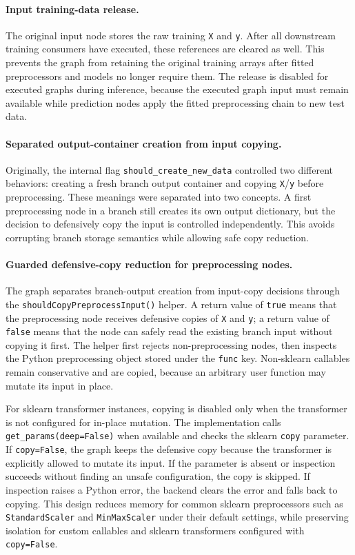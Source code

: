 \documentclass[11pt,a4paper]{article}
\begin{document}
\paragraph{Input training-data release.}
The original input node stores the raw training \texttt{X} and \texttt{y}.
After all downstream training consumers have executed, these references are
cleared as well. This prevents the graph from retaining the original training
arrays after fitted preprocessors and models no longer require them. The
release is disabled for executed graphs during inference, because the executed
graph input must remain available while prediction nodes apply the fitted
preprocessing chain to new test data.

\paragraph{Separated output-container creation from input copying.}
Originally, the internal flag \texttt{should\_create\_new\_data} controlled two
different behaviors: creating a fresh branch output container and copying
\texttt{X}/\texttt{y} before preprocessing. These meanings were separated into
two concepts. A first preprocessing node in a branch still creates its own
output dictionary, but the decision to defensively copy the input is controlled
independently. This avoids corrupting branch storage semantics while allowing
safe copy reduction.

\paragraph{Guarded defensive-copy reduction for preprocessing nodes.}
The graph separates branch-output creation from input-copy decisions through
the \texttt{shouldCopyPreprocessInput()} helper. A return value of
\texttt{true} means that the preprocessing node receives defensive copies of
\texttt{X} and \texttt{y}; a return value of \texttt{false} means that the node
can safely read the existing branch input without copying it first. The helper
first rejects non-preprocessing nodes, then inspects the Python preprocessing
object stored under the \texttt{func} key. Non-sklearn callables remain
conservative and are copied, because an arbitrary user function may mutate its
input in place.

For sklearn transformer instances, copying is disabled only when the
transformer is not configured for in-place mutation. The implementation calls
\texttt{get\_params(deep=False)} when available and checks the sklearn
\texttt{copy} parameter. If \texttt{copy=False}, the graph keeps the defensive
copy because the transformer is explicitly allowed to mutate its input. If the
parameter is absent or inspection succeeds without finding an unsafe
configuration, the copy is skipped. If inspection raises a Python error, the
backend clears the error and falls back to copying. This design reduces memory
for common sklearn preprocessors such as \texttt{StandardScaler} and
\texttt{MinMaxScaler} under their default settings, while preserving isolation
for custom callables and sklearn transformers configured with
\texttt{copy=False}.
\end{document}
